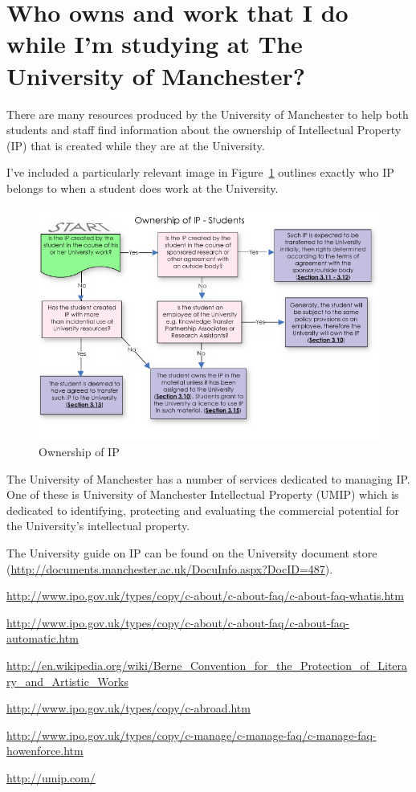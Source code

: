 \documentclass{article}
\begin{document}
\section{Who owns and work that I do while I'm studying at The University of Manchester?}

There are many resources produced by the University of Manchester to help both students and staff find information about the ownership of Intellectual Property (IP) that is created while they are at the University.

I've included a particularly relevant image in Figure~\ref{fig:IPOwnership} outlines exactly who IP belongs to when a student does work at the University.

\begin{figure}[h]
\centering
\includegraphics[width=1\textwidth]{IP-ownership-students}
\caption{Ownership of IP}
\label{fig:IPOwnership}
\end{figure}

The University of Manchester has a number of services dedicated to managing IP. One of these is University of Manchester Intellectual Property (UMIP\cite{umip}) which is dedicated to identifying, protecting and evaluating the commercial potential for the University's intellectual property.

The University guide on IP can be found on the University document store (\url{http://documents.manchester.ac.uk/DocuInfo.aspx?DocID=487}).

\begin{thebibliography}{9}

  \url{http://www.ipo.gov.uk/types/copy/c-about/c-about-faq/c-about-faq-whatis.htm}

  \url{http://www.ipo.gov.uk/types/copy/c-about/c-about-faq/c-about-faq-automatic.htm}

  \url{http://en.wikipedia.org/wiki/Berne_Convention_for_the_Protection_of_Literary_and_Artistic_Works}

  \url{http://www.ipo.gov.uk/types/copy/c-abroad.htm}

  \url{http://www.ipo.gov.uk/types/copy/c-manage/c-manage-faq/c-manage-faq-howenforce.htm}

  \url{http://umip.com/}

\end{thebibliography}
\end{document}
